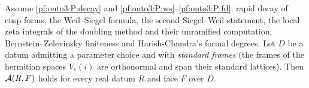 \begin{proposition}\label{pf:onto3:adelc}
Assume \ref{pf:onto3:P:decay} and \ref{pf:onto3:P:ws}--\ref{pf:onto3:P:fd}: rapid decay of cusp forms, the
Weil--Siegel formula, the second Siegel--Weil statement, the local zeta integrals of the doubling method and their
unramified computation, Bernstein--Zelevinsky finiteness and Harish-Chandra's formal degrees. Let $D$ be a datum
admitting a parameter choice and with \emph{standard frames} (the frames of the hermitian spaces $V_c(i)$ are
orthonormal and span their standard lattices). Then $\mathcal{A}(R,F)$ holds for every real datum $R$ and face
$F$ over $D$.
\end{proposition}

